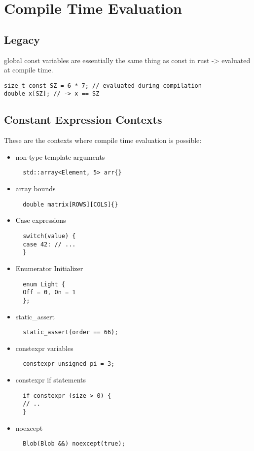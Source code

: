 \documentclass[main.tex,fontsize=8pt,paper=a4,paper=portrait,DIV=calc,]{scrartcl}
\begin{document}
\section{Compile Time Evaluation}

\subsection{Legacy}
global const variables are essentially the same thing as const in rust -> evaluated at compile time.
\begin{lstlisting}
size_t const SZ = 6 * 7; // evaluated during compilation
double x[SZ]; // -> x == SZ
\end{lstlisting}

\subsection{Constant Expression Contexts}
These are the contexts where compile time evaluation is possible:
\begin{itemize}
\item \textcolor{black}{non-type template arguments}\newline
  \begin{lstlisting}
  std::array<Element, 5> arr{}
  \end{lstlisting}
\item \textcolor{black}{array bounds}\newline
  \begin{lstlisting}
  double matrix[ROWS][COLS]{}
  \end{lstlisting}
\item \textcolor{black}{Case expressions}\newline
  \begin{lstlisting}
  switch(value) {
  case 42: // ...
  }
  \end{lstlisting}
\item \textcolor{black}{Enumerator Initializer}\newline
  \begin{lstlisting}
  enum Light {
  Off = 0, On = 1
  };
  \end{lstlisting}
\item static\_assert \newline
  \begin{lstlisting}
  static_assert(order == 66);
  \end{lstlisting}
\item constexpr variables\newline
  \begin{lstlisting}
  constexpr unsigned pi = 3;
  \end{lstlisting}
\item constexpr if statements\newline
  \begin{lstlisting}
  if constexpr (size > 0) {
  // ..
  }
  \end{lstlisting}
\item noexcept\newline
  \begin{lstlisting}
  Blob(Blob &&) noexcept(true);
  \end{lstlisting}
\end{itemize} 
\end{document}
